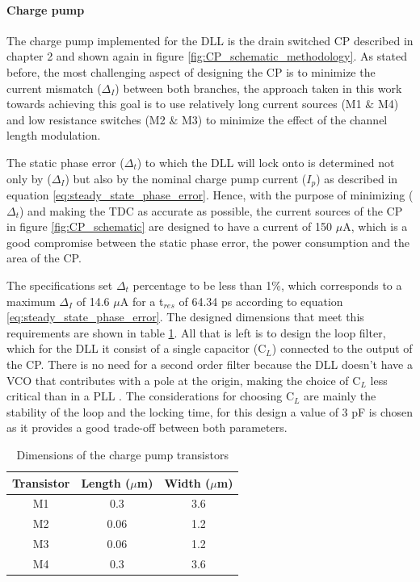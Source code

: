 \paragraph{Charge pump}
The charge pump implemented for the DLL is the drain switched CP described in chapter 2 and shown again in figure \ref{fig:CP_schematic_methodology}. As stated before, the most challenging
aspect of designing the CP is to minimize the current mismatch ($\Delta_I$) between both branches, the approach taken in this work towards achieving this goal is to use relatively long current sources
(M1 $\&$ M4) and low resistance switches (M2 $\&$ M3) to minimize the effect of the channel length modulation. 

The static phase error ($\Delta_t$) to which the DLL will lock onto is determined not only by ($\Delta_I$) but also by the nominal charge pump current ($I_p$) as described in
equation \ref{eq:steady_state_phase_error}. Hence, with the purpose of minimizing ($\Delta_t$) and making the TDC as accurate as possible, the current sources of the CP in 
figure \ref{fig:CP_schematic} are designed to have a current of 150 $\mu$A, which is a good compromise between the static phase error, the power consumption and the area of the CP.

The specifications set $\Delta_t$ percentage to be less than 1\%, which corresponds to a maximum $\Delta_I$ of 14.6 $\mu$A for a t$_{res}$ of 64.34 ps according to equation
\eqref{eq:steady_state_phase_error}. The designed dimensions that meet this requirements are shown in table \ref{tab:CP_dimensions}. All that is left is to design the loop filter,
which for the DLL it consist of a single capacitor (C$_L$) connected to the output of the CP. There is no need for a second order filter because the DLL doesn't have a VCO that 
contributes with a pole at the origin, making the choice of C$_L$ less critical than in a PLL \cite{Razavi_DLL_article}. The considerations for choosing C$_L$ are mainly the
stability of the loop and the locking time, for this design a value of 3 pF is chosen as it provides a good trade-off between both parameters.


\begin{table}[h]
    \centering
    \begin{tabular}{|c|c|c|}
        \hline
        \textbf{Transistor} & \textbf{Length ($\mu$m)} & \textbf{Width ($\mu$m)} \\
        \hline
        M1 & 0.3 & 3.6 \\
        M2 & 0.06 & 1.2 \\
        M3 & 0.06 & 1.2 \\
        M4 & 0.3 & 3.6 \\
        \hline
    \end{tabular}
    \caption{Dimensions of the charge pump transistors}
    \label{tab:CP_dimensions}
\end{table}

